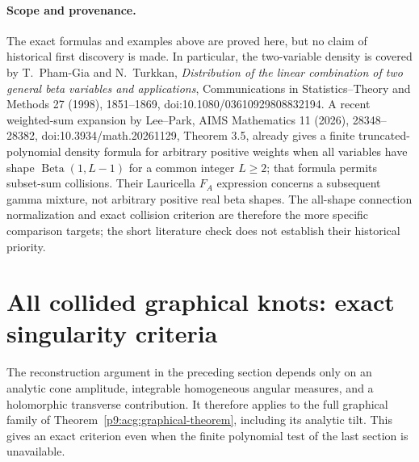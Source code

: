 \documentclass[11pt,a4paper]{article}
\theoremstyle{definition}
\theoremstyle{remark}
\numberwithin{equation}{section}
\begin{document}
\paragraph{Scope and provenance.}
The exact formulas and examples above are proved here, but no claim
of historical first discovery is made. In particular, the two-variable
density is covered by T.~Pham-Gia and N.~Turkkan,
\emph{Distribution of the linear combination of two general beta
variables and applications}, Communications in Statistics--Theory
and Methods 27 (1998), 1851--1869, doi:10.1080/03610929808832194.
A recent weighted-sum expansion by Lee--Park, AIMS Mathematics 11
(2026), 28348--28382, doi:10.3934/math.20261129, Theorem 3.5,
already gives a finite truncated-polynomial density formula for
arbitrary positive weights when all variables have shape
$\operatorname{Beta}(1,L-1)$ for a common integer $L\ge2$; that
formula permits subset-sum collisions. Their Lauricella $F_A$
expression concerns a subsequent gamma mixture, not arbitrary
positive real beta shapes. The all-shape connection normalization
and exact collision criterion are therefore the more specific
comparison targets; the short literature check does not establish
their historical priority.


\section{All collided graphical knots: exact singularity criteria}
\label{p9:sec:gsr}

The reconstruction argument in the preceding section depends only on
an analytic cone amplitude, integrable homogeneous angular measures,
and a holomorphic transverse contribution. It therefore applies to the
full graphical family of Theorem~\ref{p9:acg:graphical-theorem}, including
its analytic tilt. This gives an exact criterion even when the finite
polynomial test of the last section is unavailable.
\end{document}
